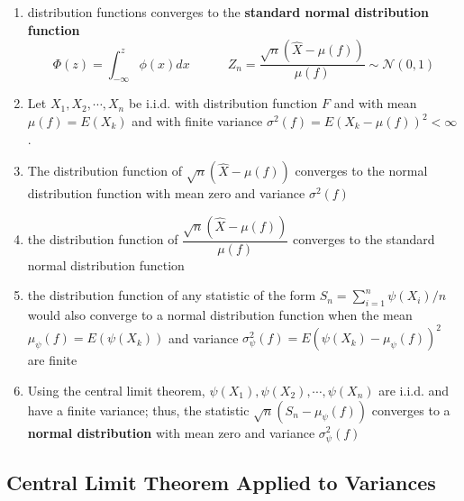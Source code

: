 \begin{enumerate}
    \item distribution functions converges to the \textbf{standard normal distribution function}
    \[
        \Phi(z) = \displaystyle\int_{-\infty}^{z}
        \phi(x)dx
        \quad\quad\quad
        Z_n = \dfrac{\sqrt{n}(\hat{X} - \mu(f))}{\mu(f)}
        \sim \mathcal{N}(0,1)
    \]

    \item Let $X_1, X_2,\cdots, X_n$ be i.i.d. with distribution function $F$ and with mean $\mu(f) = E(X_k)$ and with finite variance $\sigma ^2(f) = E(X_k - \mu(f))^2 < \infty$. 

    \item The distribution function of $\sqrt{n}(\hat{X}-\mu(f))$ converges to the normal distribution function with mean zero and variance $\sigma ^2(f)$
    
    \item the distribution function of $\dfrac{\sqrt{n}(\hat{X} - \mu(f))}{\mu(f)}$ converges to the standard normal distribution function

    \item the distribution function of any statistic of the form $S_n = \displaystyle\sum_{i=1}^{n} \psi(X_i)/n$ would also converge to a normal distribution function when the mean $\mu _\psi (f) = E(\psi (X_k))$ and variance $\sigma ^2_\psi (f) = E(\psi (X_k) - \mu _\psi (f))^2$ are finite

    \item Using the central limit theorem, $\psi(X_1), \psi(X_2), \cdots, \psi(X_n)$ are i.i.d. and have a finite variance; thus, the statistic $\sqrt{n}(S_n - \mu_\psi(f))$ converges to a \textbf{normal distribution} with mean zero and variance $\sigma^2_\psi(f)$
\end{enumerate}


\subsection{Central Limit Theorem Applied to Variances \cite{ism-1}} \label{sample statistic: Central Limit Theorem Applied to Variances}

